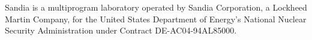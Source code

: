 Sandia is a multiprogram laboratory operated by Sandia Corporation, a Lockheed Martin Company, for the United States Department of Energy's National Nuclear Security Administration under Contract DE-AC04-94AL85000.
